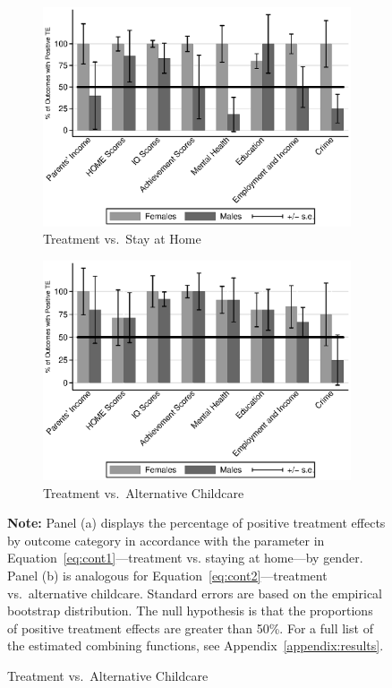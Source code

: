 \begin{figure}[H]
 \centering
 \caption{Proportion of Positively Impacted Outcomes by Category}\label{fig:cats-positive}
 \begin{subfigure}[h]{0.7\textwidth}
 	\centering
 	\caption{Treatment vs.\ Stay at Home} \label{fig:cats-positivehome}
 		\includegraphics[width=\textwidth]{output/epan_ipw_p0_cats1.eps}
 \end{subfigure}
 
 \begin{subfigure}[h]{0.7\textwidth}
 	\centering
 	\caption{Treatment vs.\ Alternative Childcare} \label{fig:cats-positivealt}
 		\includegraphics[width=\textwidth]{output/epan_ipw_p1_cats1.eps}
 \end{subfigure}
 \footnotesize \justify
\footnotesize \justify
\textbf{Note:} Panel (a) displays the percentage of positive treatment effects by outcome category in accordance with the parameter in Equation~\eqref{eq:cont1}---treatment vs. staying at home---by gender. Panel (b) is analogous for Equation~\eqref{eq:cont2}---treatment vs.\ alternative childcare. Standard errors are based on the empirical bootstrap distribution. The null hypothesis is that the proportions of positive treatment effects are greater than 50\%. For a full list of the estimated combining functions, see Appendix~\ref{appendix:results}. \\
 \end{figure}

